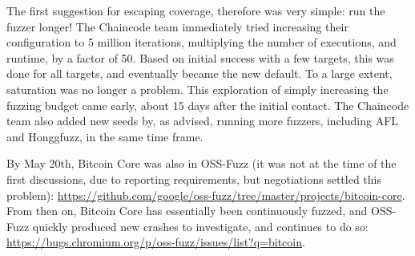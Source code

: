 The first suggestion for escaping coverage, therefore was very simple:  run the fuzzer longer!  The Chaincode team immediately tried increasing their configuration to 5 million iterations, multiplying the number of executions, and runtime, by a factor of 50.  Based on initial success with a few targets, this was done for all targets, and eventually became the new default.  To a large extent, saturation was  no longer a problem.  This exploration of simply increasing the fuzzing budget came early, about 15 days after the initial contact.  The Chaincode team also added new seeds by, as advised, running more fuzzers, including AFL and Honggfuzz, in the same time frame.

By May 20th, Bitcoin Core was also in OSS-Fuzz (it was not at the time of the first discussions, due to reporting requirements, but negotiations settled this problem): \url{https://github.com/google/oss-fuzz/tree/master/projects/bitcoin-core}.  From then on, Bitcoin Core has essentially been continuously fuzzed, and OSS-Fuzz quickly produced new crashes to investigate, and continues to do so:  \url{https://bugs.chromium.org/p/oss-fuzz/issues/list?q=bitcoin}.
